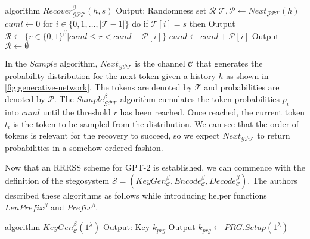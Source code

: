 \begin{Pseudocode}[caption={
RRRSS $Recover$ algorithm for GPT-2 \cite{Meteor2021}.
Given a history $h$ and a sample $s$, $Recover$ returns a set of possible random values used to generate $s$ with history $h$.
}]
algorithm $Recover_{\mathcal{GPT}}^\beta(h, s)$
  Output: Randomness set $\mathcal{R}$
  $\mathcal{T}, \mathcal{P} \leftarrow Next_{\mathcal{GPT}}(h)$
  $cuml \leftarrow 0$
  for $i \in \{ 0, 1, \dots, | \mathcal{T} - 1 | \}$ do
    if $\mathcal{T}[i] = s$ then
      Output $\mathcal{R} \leftarrow \{ r \in \{ 0, 1\}^\beta | cuml \leq r < cuml + \mathcal{P}[i] \}$
    $cuml \leftarrow cuml + \mathcal{P}[i]$
  Output $\mathcal{R} \leftarrow \emptyset$
\end{Pseudocode}

In the $Sample$ algorithm, $Next_{\mathcal{GPT}}$ is the channel $\mathcal{C}$ that generates the probability distribution for the next token given a history $h$ as shown in \autoref{fig:generative-network}.
The tokens are denoted by $\mathcal{T}$ and probabilities are denoted by $\mathcal{P}$.
The $Sample_{\mathcal{GPT}}^\beta$ algorithm cumulates the token probabilities $p_i$ into $cuml$ until the threshold $r$ has been reached.
Once reached, the current token $t_i$ is the token to be sampled from the distribution.
We can see that the order of tokens is relevant for the recovery to succeed, so we expect $Next_{\mathcal{GPT}}$ to return probabilities in a somehow ordered fashion.

Now that an RRRSS scheme for GPT-2 is established, we can commence with the definition of the stegosystem $\mathcal{S} = \left(KeyGen_{\mathcal{C}}^\beta, Encode_{\mathcal{C}}^\beta, Decode_{\mathcal{C}}^\beta \right)$.
The authors described these algorithms as follows while introducing helper functions $LenPrefix^\beta$ and $Prefix^\beta$.

\begin{Pseudocode}[caption={$KeyGen$ algorithm \cite{Meteor2021}}]
algorithm $KeyGen_{\mathcal{C}}^\beta(1^\lambda)$
  Output: Key $k_{prg}$
  Output $k_{prg} \leftarrow PRG.Setup(1^\lambda)$
\end{Pseudocode}%

